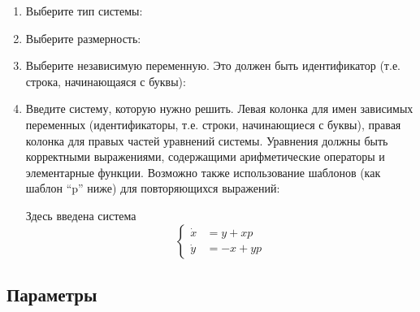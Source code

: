 \documentclass[12pt]{article}
\begin{document}
\begin{enumerate}

\item Выберите тип системы:


\item Выберите размерность:


\item Выберите независимую переменную. Это должен быть идентификатор (т.е. строка, начинающаяся с буквы):


\item Введите систему, которую нужно решить. 
Левая колонка для имен зависимых переменных
(идентификаторы, т.е. строки, начинающиеся с буквы), 
правая колонка для правых частей уравнений системы.
Уравнения должны быть корректными выражениями\EndLink{},
содержащими арифметические операторы и элементарные функции.
Возможно также использование шаблонов (как шаблон ``p'' ниже) 
для повторяющихся выражений:


Здесь введена система
\[
 \left\{
  \begin{aligned}
\dot x&=y+xp\\
\dot y&=-x+yp
  \end{aligned}
 \right.
\]
\end{enumerate}


\subsection{Параметры}
\end{document}
